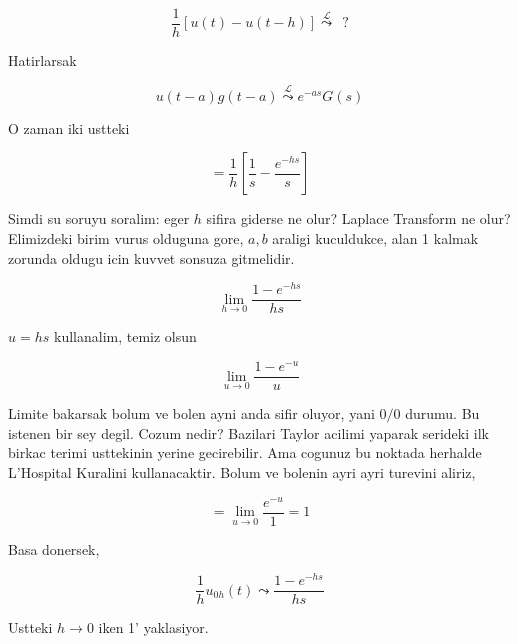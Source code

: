 \documentclass[12pt,fleqn]{article}\usepackage{../common}
\begin{document}
\[ \frac{1}{h} [ u(t) - u(t-h) ] 
\stackrel{\mathcal{L}}{\leadsto} \ \ ?
\]

Hatirlarsak

\[ u(t-a)g(t-a) \stackrel{\mathcal{L}}{\leadsto}  e^{-as}G(s) \]

O zaman iki ustteki

\[ = \frac{1}{h}[ \frac{1}{s} - \frac{e^{-hs}}{s} ]\]

Simdi su soruyu soralim: eger $h$ sifira giderse ne olur? Laplace Transform
ne olur? Elimizdeki birim vurus olduguna gore, $a,b$ araligi kuculdukce,
alan 1 kalmak zorunda oldugu icin kuvvet sonsuza gitmelidir. 

\[ \lim_{h \to 0} \frac{1-e^{-hs}}{hs} \]

$u=hs$ kullanalim, temiz olsun 

\[ \lim_{u \to 0} \frac{1-e^{-u}}{u} \]

Limite bakarsak bolum ve bolen ayni anda sifir oluyor, yani $0/0$
durumu. Bu istenen bir sey degil. Cozum nedir? Bazilari Taylor acilimi
yaparak serideki ilk birkac terimi usttekinin yerine gecirebilir. Ama
cogunuz bu noktada herhalde L'Hospital Kuralini kullanacaktir. Bolum ve
bolenin ayri ayri turevini aliriz,

\[ = \lim_{u \to 0} \frac{e^{-u}}{1} = 1\]

Basa donersek, 

\[ \frac{1}{h}u_{0h}(t) \leadsto \frac{1-e^{-hs}}{hs} \]

Ustteki $h \to 0$ iken 1' yaklasiyor.  
\end{document}
